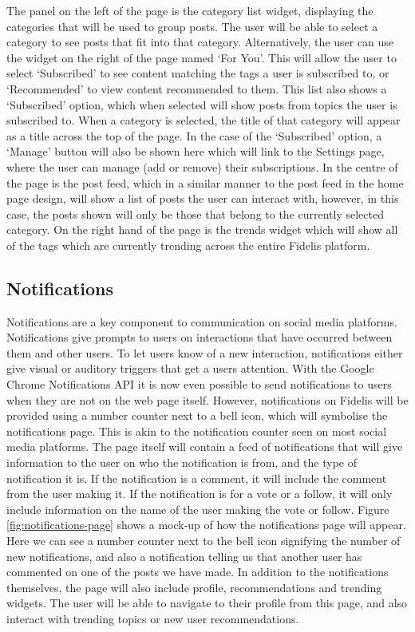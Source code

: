 The panel on the left of the page is the category list widget, displaying the categories that will be used to group posts. The user will be able to select a category to see posts that fit into that category. Alternatively, the user can use the widget on the right of the page named `For You'. This will allow the user to select `Subscribed' to see content matching the tags a user is subscribed to, or `Recommended' to view content recommended to them. This list also shows a `Subscribed' option, which when selected will show posts from topics the user is subscribed to. When a category is selected, the title of that category will appear as a title across the top of the page. In the case of the `Subscribed' option, a `Manage' button will also be shown here which will link to the Settings page, where the user can manage (add or remove) their subscriptions. In the centre of the page is the post feed, which in a similar manner to the post feed in the home page design, will show a list of posts the user can interact with, however, in this case, the posts shown will only be those that belong to the currently selected category. On the right hand of the page is the trends widget which will show all of the tags which are currently trending across the entire Fidelis platform.

\subsection{Notifications}
Notifications are a key component to communication on social media platforms. Notifications give prompts to users on interactions that have occurred between them and other users. To let users know of a new interaction, notifications either give visual or auditory triggers that get a users attention. With the Google Chrome Notifications API \cite{ChromeAPI:Notifications} it is now even possible to send notifications to users when they are not on the web page itself. However, notifications on Fidelis will be provided using a number counter next to a bell icon, which will symbolise the notifications page. This is akin to the notification counter seen on most social media platforms. The page itself will contain a feed of notifications that will give information to the user on who the notification is from, and the type of notification it is. If the notification is a comment, it will include the comment from the user making it. If the notification is for a vote or a follow, it will only include information on the name of the user making the vote or follow. Figure \ref{fig:notifications-page} shows a mock-up of how the notifications page will appear. Here we can see a number counter next to the bell icon signifying the number of new notifications, and also a notification telling us that another user has commented on one of the posts we have made. In addition to the notifications themselves, the page will also include profile, recommendations and trending widgets. The user will be able to navigate to their profile from this page, and also interact with trending topics or new user recommendations.

